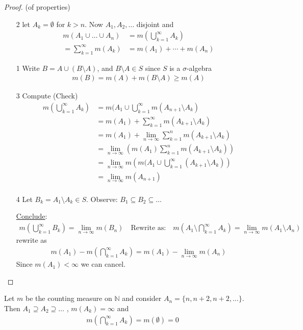 \begin{proof}(of properties)
	\begin{enumerate}
		\item[2] let $A_k = \emptyset$ for $k >n$. Now $A_1, A_2, \ldots$ disjoint and 
			\begin{align*}
				m(A_1 \cup \ldots \cup A_n) &= m(\bigcup_{k=1}^{\infty} A_k ) \\ 
				= \sum_{k=1}^{\infty} m(A_k) &= m(A_1) + \cdots + m(A_n)
			\end{align*}
		\item[1] Write $B = A \cup (B \setminus A)$, and $B \setminus A \in S$ since $S$ is a $\sigma$-algebra
			\begin{align*}
				m(B) = m(A) + m(B \setminus A) \geq m(A)
			\end{align*} 
		\item[3] Compute (Check)
			\begin{align*}
				m(\bigcup_{k=1}^{\infty} A_k) &= m(A_1 \cup \bigcup_{k=1}^{\infty} m(A_{n+1} \setminus A_k) \\
											  &= m(A_1) + \sum_{k=1}^{\infty} m(A_{k+1} \setminus A_k) \\
											  &= m(A_1) + \lim_{n \to \infty}  \sum_{k=1}^{n} m(A_{k+1} \setminus A_k) \\ 
											  &= \lim_{n \to \infty} \left(m(A_1) \sum_{k=1}^{n} m(A_{k+1} \setminus A_k) \right) \\ 
											  &= \lim_{n \to \infty} m \left(m(A_1 \cup \bigcup_{k=1}^{\infty} (A_{k+1} \setminus A_k) \right) \\ 
											  &= \lim_{n \to \infty} m (A_{n+1})  \\ 
			\end{align*} 
		\item[4] Let $B_k = A_1 \setminus A_k \in S$. Observe: $B_1 \subseteq B_2 \subseteq \ldots$

			\underline{Conclude}:
			\begin{align*}
				m(\bigcup_{k=1}^{\infty} B_k) = \lim_{n \to \infty} m(B_n) \quad \text{Rewrite as:} 
				\quad m(A_1 \setminus \bigcap_{k=1}^{\infty} A_k) = 
				\lim_{n \to \infty} m(A_1 \setminus A_n)
			\end{align*} rewrite as 
			\begin{align*}
				m(A_1) - m(\bigcap_{k=1}^{\infty} A_k) = m(A_1) - \lim_{n \to \infty} m(A_n)
			\end{align*} 
			Since $m(A_1) < \infty$ we can cancel.
	\end{enumerate}
\end{proof}

\begin{example}
	Let $m$ be the counting measure on  $\mathbb{N}$ and consider $A_n = \{n, n+2, n+2, \ldots \}$. 
	Then $A_1 \supseteq A_2 \supseteq \ldots$ , $m(A_k) = \infty$ and  
	\begin{align*}
		m(\bigcap_{k=1}^{\infty} A_k ) = m(\emptyset) = 0
	\end{align*} 
\end{example}

